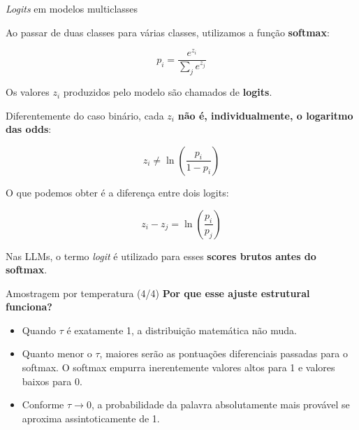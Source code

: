 \documentclass[aspectratio=169]{beamer}
\begin{document}
\begin{frame}{\textit{Logits} em modelos multiclasses}\justifying

    Ao passar de duas classes para várias classes, utilizamos a
    função \textbf{softmax}:

    \[
        p_i=
        \frac{e^{z_i}}{\sum_j e^{z_j}}
    \]

    Os valores $z_i$ produzidos pelo modelo são chamados de
    \textbf{logits}.

    \vspace{0.3cm}

    Diferentemente do caso binário, cada $z_i$ \textbf{não é,
    individualmente, o logaritmo das odds}:

    \[
        z_i \neq
        \ln\left(\frac{p_i}{1-p_i}\right)
    \]

    O que podemos obter é a diferença entre dois logits:

    \[
        \boxed{
            z_i-z_j=
            \ln\left(\frac{p_i}{p_j}\right)
        }
    \]

    \vspace{0.2cm}

    Nas LLMs, o termo \textit{logit} é utilizado para esses
    \textbf{scores brutos antes do softmax}.

\end{frame}

\begin{frame}{Amostragem por temperatura (4/4)}\justifying 
    \vspace{0.3cm}
    \textbf{Por que esse ajuste estrutural funciona?}
    \begin{itemize}
        \item Quando $\tau$ é exatamente 1, a distribuição matemática não muda.
        \item Quanto menor o $\tau$, maiores serão as pontuações diferenciais passadas para o softmax. O softmax empurra inerentemente valores altos para 1 e valores baixos para 0.
        \item Conforme $\tau \to 0$, a probabilidade da palavra absolutamente mais provável se aproxima assintoticamente de 1.
    \end{itemize}
\end{frame}
\end{document}
